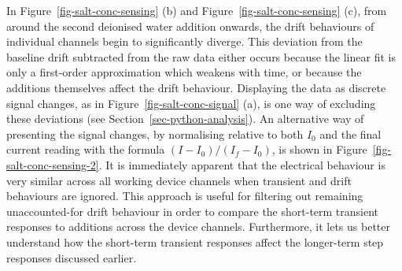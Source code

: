 \documentclass[
  a4paper,
]{scrbook}
\begin{document}
In Figure~\ref{fig-salt-conc-sensing} (b) and
Figure~\ref{fig-salt-conc-sensing} (c), from around the second deionised
water addition onwards, the drift behaviours of individual channels
begin to significantly diverge. This deviation from the baseline drift
subtracted from the raw data either occurs because the linear fit is
only a first-order approximation which weakens with time, or because the
additions themselves affect the drift behaviour. Displaying the data as
discrete signal changes, as in Figure~\ref{fig-salt-conc-signal} (a), is
one way of excluding these deviations (see
Section~\ref{sec-python-analysis}). An alternative way of presenting the
signal changes, by normalising relative to both \(I_{0}\) and the final
current reading with the formula \((I - I_{0})/(I_{f} - I_{0})\), is
shown in Figure~\ref{fig-salt-conc-sensing-2}. It is immediately
apparent that the electrical behaviour is very similar across all
working device channels when transient and drift behaviours are ignored.
This approach is useful for filtering out remaining unaccounted-for
drift behaviour in order to compare the short-term transient responses
to additions across the device channels. Furthermore, it lets us better
understand how the short-term transient responses affect the longer-term
step responses discussed earlier.
\end{document}
